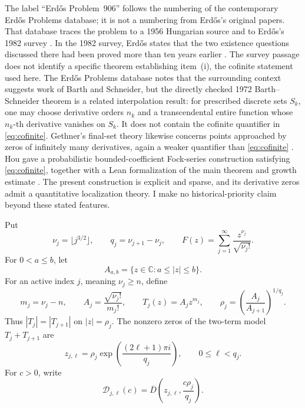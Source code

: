 \documentclass[11pt,reqno]{amsart}
\numberwithin{equation}{section}
\theoremstyle{remark}
\newcommand{\C}{\mathbb C}
\newcommand{\Aab}{A_{a,b}}
\begin{document}
The label ``Erd\H{o}s Problem~906'' follows the numbering of the contemporary Erd\H{o}s Problems database; it is not a numbering from Erd\H{o}s's original papers.  That database traces the problem to a 1956 Hungarian source and to Erd\H{o}s's 1982 survey \cite{Bloom906}.  In the 1982 survey, Erd\H{o}s states that the two existence questions discussed there had been proved more than ten years earlier \cite[p.~72]{Erdos82}.  The survey passage does not identify a specific theorem establishing item~(i), the cofinite statement used here.  The Erd\H{o}s Problems database notes that the surrounding context suggests work of Barth and Schneider, but the directly checked 1972 Barth--Schneider theorem \cite{BS72} is a related interpolation result: for prescribed discrete sets $S_k$, one may choose derivative orders $n_k$ and a transcendental entire function whose $n_k$-th derivative vanishes on $S_k$.  It does not contain the cofinite quantifier in \eqref{eq:cofinite}.  Gethner's final-set theory likewise concerns points approached by zeros of infinitely many derivatives, again a weaker quantifier than \eqref{eq:cofinite} \cite{Gethner85}.  Hou gave a probabilistic bounded-coefficient Fock-series construction satisfying \eqref{eq:cofinite}, together with a Lean formalization of the main theorem and growth estimate \cite{Hou26}.  The present construction is explicit and sparse, and its derivative zeros admit a quantitative localization theory.  I make no historical-priority claim beyond these stated features.

Put
\begin{equation}\label{eq:series}
 \nu_j=\lfloor j^{3/2}\rfloor,\qquad
 q_j=\nu_{j+1}-\nu_j,\qquad
 F(z)=\sum_{j=1}^{\infty}\frac{z^{\nu_j}}{\sqrt{\nu_j!}}.
\end{equation}
For $0<a\le b$, let
\[
 \Aab=\{z\in\C:a\le |z|\le b\}.
\]
For an active index $j$, meaning $\nu_j\ge n$, define
\begin{equation}\label{eq:weights}
 m_j=\nu_j-n,\qquad
 A_j=\frac{\sqrt{\nu_j!}}{m_j!},\qquad
 T_j(z)=A_jz^{m_j},\qquad
 \rho_j=\left(\frac{A_j}{A_{j+1}}\right)^{1/q_j}.
\end{equation}
Thus $|T_j|=|T_{j+1}|$ on $|z|=\rho_j$.  The nonzero zeros of the two-term model $T_j+T_{j+1}$ are
\begin{equation}\label{eq:centers}
 z_{j,\ell}=\rho_j\exp\!\left(\frac{(2\ell+1)\pi i}{q_j}\right),
 \qquad 0\le\ell<q_j.
\end{equation}
For $c>0$, write
\begin{equation}\label{eq:modeldisk}
 \mathcal D_{j,\ell}(c)=\overline D\!\left(z_{j,\ell},\frac{c\rho_j}{q_j}\right).
\end{equation}
\end{document}
